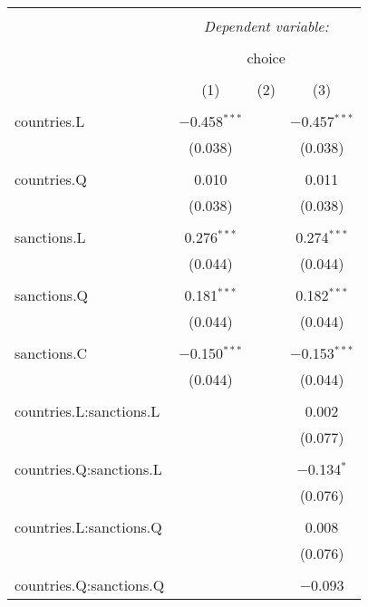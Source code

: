 
\begin{table}[!htbp] \centering 
  \caption{} 
  \label{tab:all} 
\begin{tabular}{@{\extracolsep{5pt}}lccc} 
\\[-1.8ex]\hline 
\hline \\[-1.8ex] 
 & \multicolumn{3}{c}{\textit{Dependent variable:}} \\ 
\cline{2-4} 
\\[-1.8ex] & \multicolumn{3}{c}{choice} \\ 
\\[-1.8ex] & (1) & (2) & (3)\\ 
\hline \\[-1.8ex] 
 countries.L & $-$0.458$^{***}$ &  & $-$0.457$^{***}$ \\ 
  & (0.038) &  & (0.038) \\ 
  & & & \\ 
 countries.Q & 0.010 &  & 0.011 \\ 
  & (0.038) &  & (0.038) \\ 
  & & & \\ 
 sanctions.L & 0.276$^{***}$ &  & 0.274$^{***}$ \\ 
  & (0.044) &  & (0.044) \\ 
  & & & \\ 
 sanctions.Q & 0.181$^{***}$ &  & 0.182$^{***}$ \\ 
  & (0.044) &  & (0.044) \\ 
  & & & \\ 
 sanctions.C & $-$0.150$^{***}$ &  & $-$0.153$^{***}$ \\ 
  & (0.044) &  & (0.044) \\ 
  & & & \\ 
 countries.L:sanctions.L &  &  & 0.002 \\ 
  &  &  & (0.077) \\ 
  & & & \\ 
 countries.Q:sanctions.L &  &  & $-$0.134$^{*}$ \\ 
  &  &  & (0.076) \\ 
  & & & \\ 
 countries.L:sanctions.Q &  &  & 0.008 \\ 
  &  &  & (0.076) \\ 
  & & & \\ 
 countries.Q:sanctions.Q &  &  & $-$0.093 \\ 

\end{tabular}
\end{table}
